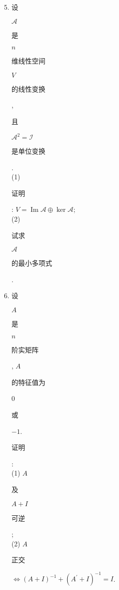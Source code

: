 \documentclass[10pt]{article}
\begin{document}
\begin{enumerate}
  \setcounter{enumi}{4}
  \item \begin{CJK}{UTF8}{mj}设\end{CJK} $\mathscr{A}$ \begin{CJK}{UTF8}{mj}是\end{CJK} $n$ \begin{CJK}{UTF8}{mj}维线性空间\end{CJK} $V$ \begin{CJK}{UTF8}{mj}的线性变换\end{CJK}, \begin{CJK}{UTF8}{mj}且\end{CJK} $\mathscr{A}^{2}=\mathscr{I}$ \begin{CJK}{UTF8}{mj}是单位变换\end{CJK}.\\
(1) \begin{CJK}{UTF8}{mj}证明\end{CJK}: $V=\operatorname{Im} \mathscr{A} \oplus \operatorname{ker} \mathscr{A}$;\\
(2) \begin{CJK}{UTF8}{mj}试求\end{CJK} $\mathscr{A}$ \begin{CJK}{UTF8}{mj}的最小多项式\end{CJK}.

  \item \begin{CJK}{UTF8}{mj}设\end{CJK} $A$ \begin{CJK}{UTF8}{mj}是\end{CJK} $n$ \begin{CJK}{UTF8}{mj}阶实矩阵\end{CJK}, $A$ \begin{CJK}{UTF8}{mj}的特征值为\end{CJK} 0 \begin{CJK}{UTF8}{mj}或\end{CJK} $-1$. \begin{CJK}{UTF8}{mj}证明\end{CJK}:\\
(1) $A$ \begin{CJK}{UTF8}{mj}及\end{CJK} $A+I$ \begin{CJK}{UTF8}{mj}可逆\end{CJK};\\
(2) $A$ \begin{CJK}{UTF8}{mj}正交\end{CJK} $\Leftrightarrow(A+I)^{-1}+\left(A^{\prime}+I\right)^{-1}=I$.


\end{enumerate}
\end{document}
